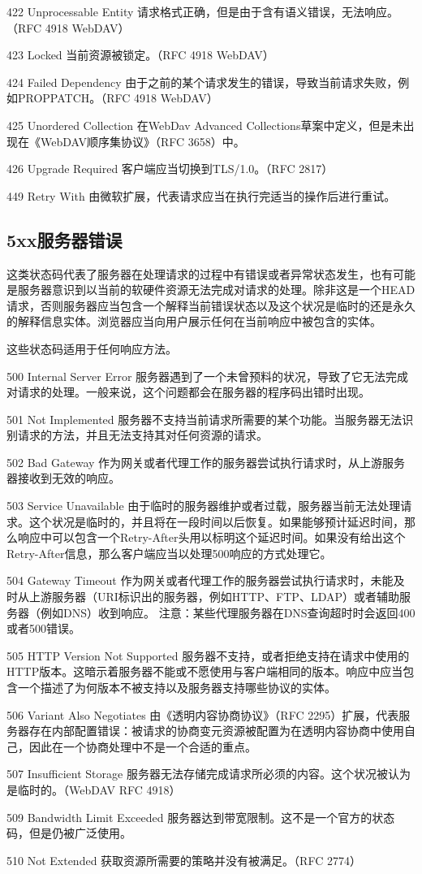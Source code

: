 422 Unprocessable Entity
请求格式正确，但是由于含有语义错误，无法响应。（RFC 4918 WebDAV）

423 Locked
当前资源被锁定。（RFC 4918 WebDAV）

424 Failed Dependency
由于之前的某个请求发生的错误，导致当前请求失败，例如PROPPATCH。（RFC 4918 WebDAV）

425 Unordered Collection
在WebDav Advanced Collections草案中定义，但是未出现在《WebDAV顺序集协议》（RFC 3658）中。

426 Upgrade Required
客户端应当切换到TLS/1.0。（RFC 2817）

449 Retry With
由微软扩展，代表请求应当在执行完适当的操作后进行重试。

\subsection{5xx服务器错误}
这类状态码代表了服务器在处理请求的过程中有错误或者异常状态发生，也有可能是服务器意识到以当前的软硬件资源无法完成对请求的处理。除非这是一个HEAD请求，否则服务器应当包含一个解释当前错误状态以及这个状况是临时的还是永久的解释信息实体。浏览器应当向用户展示任何在当前响应中被包含的实体。

这些状态码适用于任何响应方法。

500 Internal Server Error
服务器遇到了一个未曾预料的状况，导致了它无法完成对请求的处理。一般来说，这个问题都会在服务器的程序码出错时出现。

501 Not Implemented
服务器不支持当前请求所需要的某个功能。当服务器无法识别请求的方法，并且无法支持其对任何资源的请求。

502 Bad Gateway
作为网关或者代理工作的服务器尝试执行请求时，从上游服务器接收到无效的响应。

503 Service Unavailable
由于临时的服务器维护或者过载，服务器当前无法处理请求。这个状况是临时的，并且将在一段时间以后恢复。如果能够预计延迟时间，那么响应中可以包含一个Retry-After头用以标明这个延迟时间。如果没有给出这个Retry-After信息，那么客户端应当以处理500响应的方式处理它。

504 Gateway Timeout
作为网关或者代理工作的服务器尝试执行请求时，未能及时从上游服务器（URI标识出的服务器，例如HTTP、FTP、LDAP）或者辅助服务器（例如DNS）收到响应。
注意：某些代理服务器在DNS查询超时时会返回400或者500错误。

505 HTTP Version Not Supported
服务器不支持，或者拒绝支持在请求中使用的HTTP版本。这暗示着服务器不能或不愿使用与客户端相同的版本。响应中应当包含一个描述了为何版本不被支持以及服务器支持哪些协议的实体。

506 Variant Also Negotiates
由《透明内容协商协议》（RFC 2295）扩展，代表服务器存在内部配置错误：被请求的协商变元资源被配置为在透明内容协商中使用自己，因此在一个协商处理中不是一个合适的重点。

507 Insufficient Storage
服务器无法存储完成请求所必须的内容。这个状况被认为是临时的。（WebDAV RFC 4918）

509 Bandwidth Limit Exceeded
服务器达到带宽限制。这不是一个官方的状态码，但是仍被广泛使用。

510 Not Extended
获取资源所需要的策略并没有被满足。（RFC 2774）

 
 
 
 
 
 
